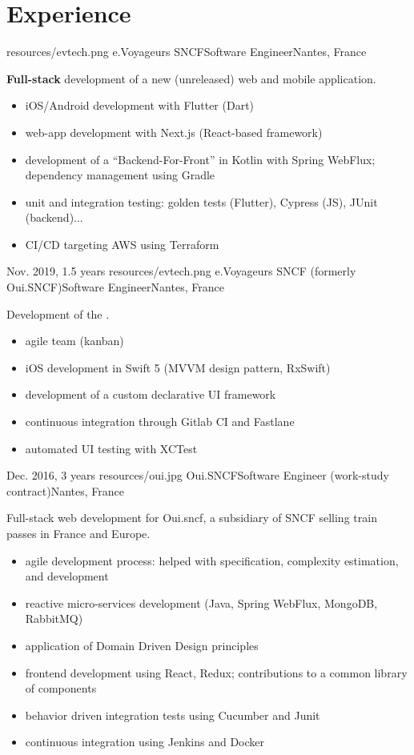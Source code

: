 \documentclass{cv}
\begin{document}
\section{Experience}


{resources/evtech.png}
{e.Voyageurs SNCF}{Software Engineer}{Nantes, France}{

\textbf{Full-stack} development of a new (unreleased) web and mobile application.

\begin{itemize}
	\item iOS/Android development with Flutter (Dart)
	\item web-app development with Next.js (React-based framework)
	\item development of a ``Backend-For-Front'' in Kotlin with Spring WebFlux; dependency management using Gradle
	\item unit and integration testing: golden tests (Flutter), Cypress (JS), JUnit (backend)...
	\item CI/CD targeting AWS using Terraform
\end{itemize}
}

\experience
{{Nov. 2019,  1.5 years}}
{resources/evtech.png}
{e.Voyageurs SNCF (formerly Oui.SNCF)}{Software Engineer}{Nantes, France}{

Development of the \href{https://apps.apple.com/fr/app/oui-sncf-train-et-bus/id343889987}{}. 

\begin{itemize}
	\item agile team (kanban)
	\item iOS development in Swift 5 (MVVM design pattern, RxSwift)
	\item development of a custom declarative UI framework
	\item continuous integration through Gitlab CI and Fastlane
	\item automated UI testing with XCTest
\end{itemize}
}

\experience
{{Dec. 2016,  3 years}}
{resources/oui.jpg}
{Oui.SNCF}{Software Engineer (work-study contract)}{Nantes, France}{

Full-stack web development for Oui.sncf, a subsidiary of SNCF selling train passes in France and Europe. 

\begin{itemize}
	\item agile development process: helped with specification, complexity estimation, and development
	\item reactive micro-services development (Java, Spring WebFlux, MongoDB, RabbitMQ)
	\item application of Domain Driven Design principles
	\item frontend development using React, Redux; contributions to a common library of components
	\item behavior driven integration tests using Cucumber and Junit
	\item continuous integration using Jenkins and Docker
\end{itemize}
}
\end{document}
